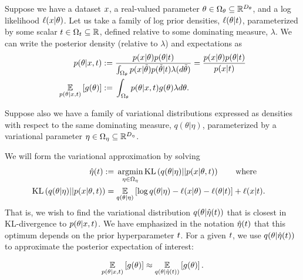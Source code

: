 Suppose we have a dataset $x$, a real-valued parameter $\theta \in \Omega_{\theta}
\subseteq \mathbb{R}^{D_{\theta}}$, and a log likelihood $\ell(x | \theta)$.
Let us take a family of log prior densities, $\ell(\theta \vert t)$,
parameterized by some scalar $t \in \Omega_{t} \subseteq \mathbb{R}$, defined
relative to some dominating measure, $\lambda$.  We can write the posterior
density (relative to $\lambda$) and expectations as
%
\begin{align*}
%
p(\theta \vert \x, \t) :={}&
    \frac{p(\x \vert \theta) p(\theta \vert \t)}
         {\int_{\thetadom} p(\x \vert \tilde{\theta}) p(\tilde{\theta} \vert \t)
               \lambda(d \tilde{\theta})}
= \frac{p(\x \vert \theta) p(\theta \vert \t)}{p(\x \vert \t)} \\
\expect{p(\theta \vert \x, \t)}{\g(\theta)} :={}&
    \int_{\thetadom} p(\theta \vert \x, \t) g(\theta) \lambda{d\theta}.
%
\end{align*}
%

Suppose also we have a family of variational distributions
expressed as densities with respect to the same dominating measure, $q(\theta
\vert \eta)$, parameterized by a variational parameter $\eta \in \Omega_{\eta}
\subseteq \mathbb{R}^{D_{\eta}}$.

We will form the variational approximation by solving
%
\begin{align*}
%
\etaopt(\t) :={}&
    \argmin_{\eta \in \etadom}
        \KL{\q(\theta \vert \eta) || p(\x \vert \theta, \t)} \mathwhere \\
\KL{\q(\theta \vert \eta) || p(\x \vert \theta, \t)}
={}&    \expect{\q(\theta \vert \eta)}{
        \log \q(\theta \vert \eta) - \logp(\x \vert \theta) -
        \logp(\theta \vert \t)} + \logp(\x \vert \t).
%
\end{align*}
%
That is, we wish to find the variational distribution $q(\theta \vert
\hat\eta(t))$ that is closest in KL-divergence to $p(\theta \vert x, t)$.  We
have emphasized in the notation $\hat\eta(t)$ that this optimum depends on the
prior hyperparameter $t$.  For a given $t$, we use $q(\theta \vert
\hat\eta(t))$ to approximate the posterior expectation of interest:

%
\begin{align*}
%
\expect{p(\theta \vert \x, \t)}{\g(\theta)} \approx
    \expect{\q(\theta \vert \etaopt(\t))}{\g(\theta)}.
%
\end{align*}
%


